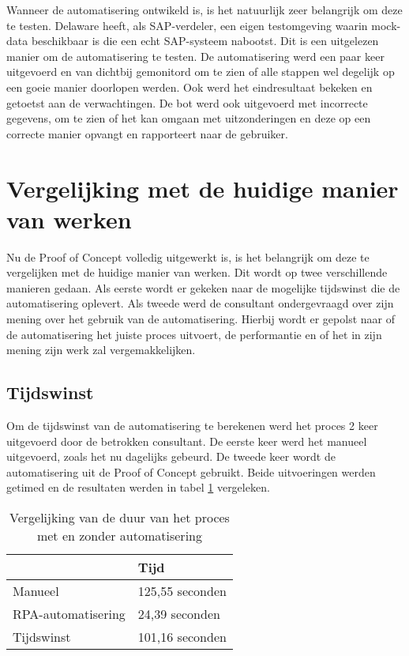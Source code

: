 Wanneer de automatisering ontwikeld is, is het natuurlijk zeer belangrijk om deze te testen. Delaware heeft, als SAP-verdeler, een eigen testomgeving waarin mock-data beschikbaar is die een echt SAP-systeem nabootst. Dit is een uitgelezen manier om de automatisering te testen.
De automatisering werd een paar keer uitgevoerd en van dichtbij gemonitord om te zien of alle stappen wel degelijk op een goeie manier doorlopen werden. Ook werd het eindresultaat bekeken en getoetst aan de verwachtingen. De bot werd ook uitgevoerd met incorrecte gegevens, om te zien of het kan omgaan met uitzonderingen en deze op een correcte manier opvangt en rapporteert naar de gebruiker.

\section{Vergelijking met de huidige manier van werken}
\label{sec:vergelijking-huidige-manier}

Nu de Proof of Concept volledig uitgewerkt is, is het belangrijk om deze te vergelijken met de huidige manier van werken. Dit wordt op twee verschillende manieren gedaan. Als eerste wordt er gekeken naar de mogelijke tijdswinst die de automatisering oplevert.
Als tweede werd de consultant ondergevraagd over zijn mening over het gebruik van de automatisering. Hierbij wordt er gepolst naar of de automatisering het juiste proces uitvoert, de performantie en of het in zijn mening zijn werk zal vergemakkelijken.

\subsection{Tijdswinst}
\label{subsec:tijdswinst}

Om de tijdswinst van de automatisering te berekenen werd het proces 2 keer uitgevoerd door de betrokken consultant. De eerste keer werd het manueel uitgevoerd, zoals het nu dagelijks gebeurd. De tweede keer wordt de automatisering uit de Proof of Concept gebruikt.
Beide uitvoeringen werden getimed en de resultaten werden in tabel \ref{tab:tijdswinst} vergeleken.

\begin{table}[h]
    \centering
        \begin{tabular}{|l|l|}
            \hline
            & Tijd \\ \hline
            Manueel & 125,55 seconden \\ \hline
            RPA-automatisering & 24,39 seconden \\ \hline
            Tijdswinst & 101,16 seconden \\ \hline
        \end{tabular}
    \caption{Vergelijking van de duur van het proces met en zonder automatisering}
    \label{tab:tijdswinst}
\end{table}

